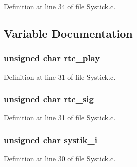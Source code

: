 Definition at line 34 of file Systick.\+c.



\subsection{Variable Documentation}
\subsubsection[{\texorpdfstring{rtc\+\_\+play}{rtc_play}}]{\setlength{\rightskip}{0pt plus 5cm}unsigned char rtc\+\_\+play}\hypertarget{iot-lab___a8-_m3_2_systick_8h_ae0a2d8ce5ed66a755934203ebdb666ac}{}\label{iot-lab___a8-_m3_2_systick_8h_ae0a2d8ce5ed66a755934203ebdb666ac}


Definition at line 31 of file Systick.\+c.

\subsubsection[{\texorpdfstring{rtc\+\_\+sig}{rtc_sig}}]{\setlength{\rightskip}{0pt plus 5cm}unsigned char rtc\+\_\+sig}\hypertarget{iot-lab___a8-_m3_2_systick_8h_add90cbf2f306b02a95fd2d83015f393d}{}\label{iot-lab___a8-_m3_2_systick_8h_add90cbf2f306b02a95fd2d83015f393d}


Definition at line 31 of file Systick.\+c.

\subsubsection[{\texorpdfstring{systik\+\_\+i}{systik_i}}]{\setlength{\rightskip}{0pt plus 5cm}unsigned char systik\+\_\+i}\hypertarget{iot-lab___a8-_m3_2_systick_8h_a0eab83a5030febd8f48cd5bfa173968b}{}\label{iot-lab___a8-_m3_2_systick_8h_a0eab83a5030febd8f48cd5bfa173968b}


Definition at line 30 of file Systick.\+c.


